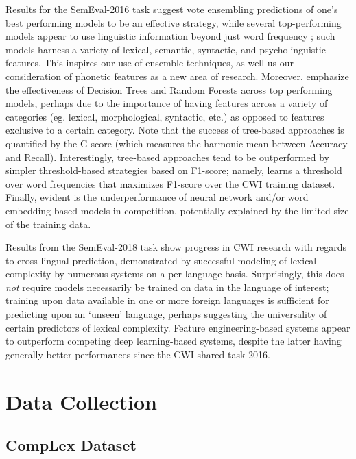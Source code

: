 \documentclass{dcthesis}
\theoremstyle{definition}
\theoremstyle{remark}
\begin{document}
Results for the SemEval-2016 task \citep{zampieri2017complex} suggest vote ensembling predictions of one's best performing models to be an effective strategy, while several top-performing models appear to use linguistic information beyond just word frequency \citep{paetzold2016sv000gg, ronzano2016taln, mukherjee2016ju_nlp}; such models harness a variety of lexical, semantic, syntactic, and psycholinguistic features. This inspires our use of ensemble techniques, as well us our consideration of phonetic features as a new area of research. Moreover, \citet{zampieri2017complex} emphasize the effectiveness of Decision Trees and Random Forests across top performing models, perhaps due to the importance of having features across a variety of categories (eg. lexical, morphological, syntactic, etc.) as opposed to features exclusive to a certain category. Note that the success of tree-based approaches is quantified by the G-score (which measures the harmonic mean between Accuracy and Recall). Interestingly, tree-based approaches tend to be outperformed by simpler threshold-based strategies based on F1-score; namely, \citet{wrobel2016plujagh} learns a threshold over word frequencies that maximizes F1-score over the CWI training dataset. Finally, evident is the underperformance of neural network and/or word embedding-based models in competition, potentially explained by the limited size of the training data.

Results from the SemEval-2018 task \citep{yimam2018report} show progress in CWI research with regards to cross-lingual prediction, demonstrated by successful modeling of lexical complexity by numerous systems on a per-language basis. Surprisingly, this does \textit{not} require models necessarily be trained on data in the language of interest; training upon data available in one or more foreign languages is sufficient for predicting upon an `unseen' language, perhaps suggesting the universality of certain predictors of lexical complexity. Feature engineering-based systems appear to outperform competing deep learning-based systems, despite the latter having generally better performances since the CWI shared task 2016. 

\chapter{Data Collection}

\section{CompLex Dataset}
\end{document}
